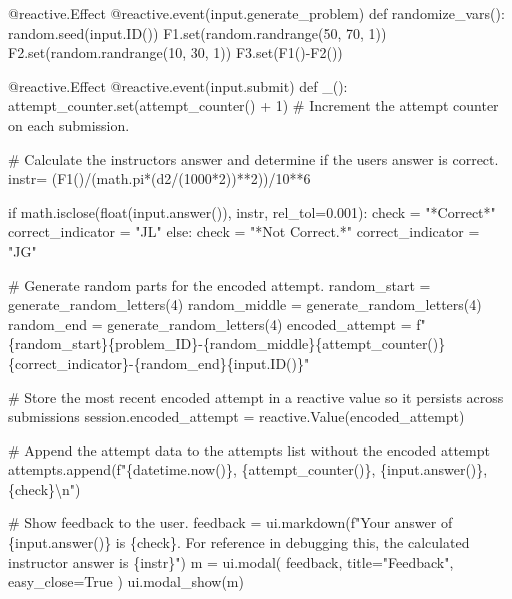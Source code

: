\documentclass[
  letterpaper,
  DIV=11,
  numbers=noendperiod]{scrreprt}
\newenvironment{Shaded}{\begin{snugshade}}{\end{snugshade}}
\newcommand{\NormalTok}[1]{\textcolor[rgb]{0.00,0.23,0.31}{#1}}
\begin{document}
\begin{Shaded}
\begin{Highlighting}[]
\NormalTok{    @reactive.Effect}
\NormalTok{    @reactive.event(input.generate\_problem)}
\NormalTok{    def randomize\_vars():}
\NormalTok{        random.seed(input.ID())}
\NormalTok{        F1.set(random.randrange(50, 70, 1))}
\NormalTok{        F2.set(random.randrange(10, 30, 1))}
\NormalTok{        F3.set(F1(){-}F2())}
        

\NormalTok{    @reactive.Effect}
\NormalTok{    @reactive.event(input.submit)}
\NormalTok{    def \_():}
\NormalTok{        attempt\_counter.set(attempt\_counter() + 1)  \# Increment the attempt counter on each submission.}
        
\NormalTok{        \# Calculate the instructor\textquotesingle{}s answer and determine if the user\textquotesingle{}s answer is correct.}
\NormalTok{        instr= (F1()/(math.pi*(d2/(1000*2))**2))/10**6}
        
\NormalTok{        if math.isclose(float(input.answer()), instr, rel\_tol=0.001):}
\NormalTok{            check = "*Correct*"}
\NormalTok{            correct\_indicator = "JL"}
\NormalTok{        else:}
\NormalTok{            check = "*Not Correct.*"}
\NormalTok{            correct\_indicator = "JG"}

\NormalTok{        \# Generate random parts for the encoded attempt.}
\NormalTok{        random\_start = generate\_random\_letters(4)}
\NormalTok{        random\_middle = generate\_random\_letters(4)}
\NormalTok{        random\_end = generate\_random\_letters(4)}
\NormalTok{        encoded\_attempt = f"\{random\_start\}\{problem\_ID\}{-}\{random\_middle\}\{attempt\_counter()\}\{correct\_indicator\}{-}\{random\_end\}\{input.ID()\}"}

\NormalTok{        \# Store the most recent encoded attempt in a reactive value so it persists across submissions}
\NormalTok{        session.encoded\_attempt = reactive.Value(encoded\_attempt)}

\NormalTok{        \# Append the attempt data to the attempts list without the encoded attempt}
\NormalTok{        attempts.append(f"\{datetime.now()\}, \{attempt\_counter()\}, \{input.answer()\}, \{check\}\textbackslash{}n")}

\NormalTok{        \# Show feedback to the user.}
\NormalTok{        feedback = ui.markdown(f"Your answer of \{input.answer()\} is \{check\}. For reference in debugging this, the calculated instructor answer is \{instr\}")}
\NormalTok{        m = ui.modal(}
\NormalTok{            feedback,}
\NormalTok{            title="Feedback",}
\NormalTok{            easy\_close=True}
\NormalTok{        )}
\NormalTok{        ui.modal\_show(m)}


\end{Highlighting}
\end{Shaded}
\end{document}
